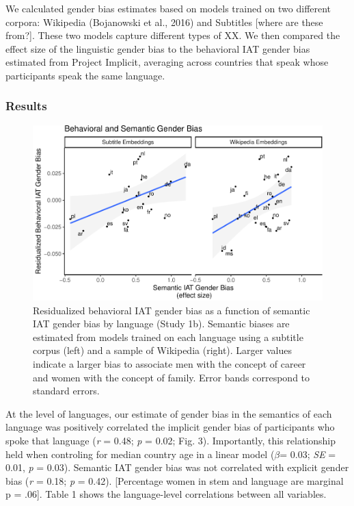 \documentclass[man,floatsintext]{apa6}
\theoremstyle{definition}
\theoremstyle{definition}
\theoremstyle{definition}
\theoremstyle{remark}
\begin{document}
We calculated gender bias estimates based on models trained on two
different corpora: Wikipedia (Bojanowski et al., 2016) and Subtitles
{[}where are these from?{]}. These two models capture different types of
XX. We then compared the effect size of the linguistic gender bias to
the behavioral IAT gender bias estimated from Project Implicit,
averaging across countries that speak whose participants speak the same
language.

\subsubsection{Results}\label{results}

\begin{figure}
\centering
\includegraphics{iat_lang_files/figure-latex/unnamed-chunk-13-1.pdf}
\caption{\label{fig:unnamed-chunk-13}Residualized behavioral IAT gender bias
as a function of semantic IAT gender bias by language (Study 1b).
Semantic biases are estimated from models trained on each language using
a subtitle corpus (left) and a sample of Wikipedia (right). Larger
values indicate a larger bias to associate men with the concept of
career and women with the concept of family. Error bands correspond to
standard errors.}
\end{figure}

At the level of languages, our estimate of gender bias in the semantics
of each language was positively correlated the implicit gender bias of
participants who spoke that language (\emph{r} = 0.48; \emph{p} = 0.02;
Fig. 3). Importantly, this relationship held when controling for median
country age in a linear model (\(\beta\)= 0.03; \emph{SE} = 0.01,
\emph{p} = 0.03). Semantic IAT gender bias was not correlated with
explicit gender bias (\emph{r} = 0.18; \emph{p} = 0.42). {[}Percentage
women in stem and language are marginal p = .06{]}. Table 1 shows the
language-level correlations between all variables.
\end{document}
